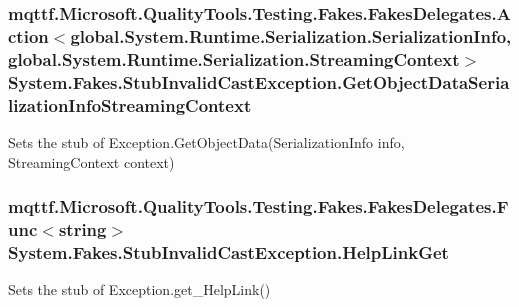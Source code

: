 \hypertarget{class_system_1_1_fakes_1_1_stub_invalid_cast_exception_af4643b595538d85ac77c0bca4c87d28d}{
\subsubsection[{Get\-Object\-Data\-Serialization\-Info\-Streaming\-Context}]{\setlength{\rightskip}{0pt plus 5cm}mqttf.\-Microsoft.\-Quality\-Tools.\-Testing.\-Fakes.\-Fakes\-Delegates.\-Action$<$global.\-System.\-Runtime.\-Serialization.\-Serialization\-Info, global.\-System.\-Runtime.\-Serialization.\-Streaming\-Context$>$ System.\-Fakes.\-Stub\-Invalid\-Cast\-Exception.\-Get\-Object\-Data\-Serialization\-Info\-Streaming\-Context}}\label{class_system_1_1_fakes_1_1_stub_invalid_cast_exception_af4643b595538d85ac77c0bca4c87d28d}


Sets the stub of Exception.\-Get\-Object\-Data(\-Serialization\-Info info, Streaming\-Context context)

\hypertarget{class_system_1_1_fakes_1_1_stub_invalid_cast_exception_a9738b4d6f9b3b316803271a0dcd11b39}{
\subsubsection[{Help\-Link\-Get}]{\setlength{\rightskip}{0pt plus 5cm}mqttf.\-Microsoft.\-Quality\-Tools.\-Testing.\-Fakes.\-Fakes\-Delegates.\-Func$<$string$>$ System.\-Fakes.\-Stub\-Invalid\-Cast\-Exception.\-Help\-Link\-Get}}\label{class_system_1_1_fakes_1_1_stub_invalid_cast_exception_a9738b4d6f9b3b316803271a0dcd11b39}


Sets the stub of Exception.\-get\-\_\-\-Help\-Link()

